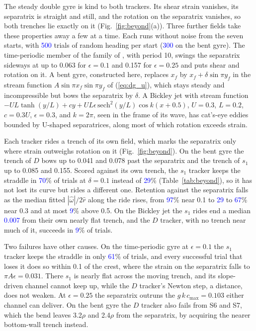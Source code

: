 \documentclass[lettersize,journal]{IEEEtran}
\newcommand{\rev}[1]{#1}
\newcommand{\prelim}[1]{\textcolor{blue}{#1}}
\begin{document}
The steady double gyre is kind to both trackers. Its shear strain
vanishes, its separatrix is straight and still, and the rotation on the
separatrix vanishes, so both trenches lie exactly on it
(Fig.~\ref{fig:beyond}(a)). Three further fields take these properties
away a few at a time. Each runs without noise from the seven starts, with
\prelim{500} trials of random heading per start (\prelim{300} on the bent
gyre). The time-periodic member of
the family of \cite{14}, with period 10, swings the separatrix sideways at
up to 0.063 for $\epsilon = 0.1$ and 0.157 for $\epsilon = 0.25$ and puts
shear and rotation on it. A bent gyre, constructed here, replaces $x_f$ by
$x_f + \delta\sin\pi y_f$ in the stream function $A\sin\pi x_f\sin\pi y_f$
of (\ref{eq:dg_u}), which stays steady and incompressible but bows the
separatrix by $\delta$. A Bickley jet \cite{34}
with stream function
$-UL\tanh(y/L) + cy + UL\epsilon\,\mathrm{sech}^2(y/L)\cos k(x + 0.5)$,
$U = 0.3$, $L = 0.2$, $c = 0.3U$, $\epsilon = 0.3$, and $k = 2\pi$, seen in
the frame of its wave, has cat's-eye eddies bounded by U-shaped
separatrices, along most of which rotation exceeds strain.

Each tracker rides a trench of its own field, which marks the separatrix
only where strain outweighs rotation on it (Fig.~\ref{fig:beyond}). On the bent gyre the trench of $D$ bows up to
0.041 and 0.078 past the separatrix and the trench of $s_1$ up to 0.085
and 0.155. Scored against its own trench, the $s_1$ tracker keeps the
straddle in \prelim{70}\% of trials at $\delta = 0.1$ instead of
\prelim{29}\% (Table~\ref{tab:beyond}), so it has not lost its curve but
rides a different one. Retention against the
separatrix falls as the median fitted $|\hat{\omega}|/2\hat{r}$ along the
ride rises, from \prelim{97}\% near 0.1 to \prelim{29} to \prelim{67}\% near 0.3
and at most \prelim{9}\% above 0.5. On the Bickley jet the $s_1$ rides end a
median \prelim{0.007} from their own nearly flat trench, and the $D$
tracker, with no trench near much of it, succeeds in \prelim{9}\% of
trials.

Two failures have other causes. On the time-periodic gyre at
$\epsilon = 0.1$ the $s_1$ tracker keeps the straddle in only \prelim{61}\%
of trials, and every successful trial that loses it does so within 0.1 of
the crest, where the strain on the separatrix falls to
$\pi A\epsilon = 0.031$. There $s_1$ is nearly flat across the
moving trench, and its slope-driven channel cannot keep up, while the $D$
tracker's Newton step, a distance, does not weaken. At $\epsilon = 0.25$
the separatrix outruns the $g\,k\,c_{\max} = \rev{0.103}$ either channel
can deliver. On the bent gyre the $D$ tracker also fails from S6 and S7,
which the bend leaves \rev{3.2}$\rho$ and \rev{2.4}$\rho$ from the
separatrix, by acquiring the nearer bottom-wall trench instead.
\end{document}
